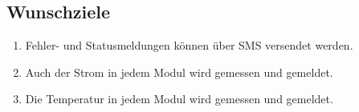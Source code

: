 \subsection{Wunschziele}
\begin{enumerate}
\item	Fehler- und Statusmeldungen können über SMS versendet werden.
\item	Auch der Strom in jedem Modul wird gemessen und gemeldet.
\item	Die Temperatur in jedem Modul wird gemessen und gemeldet.
\end{enumerate}
%
